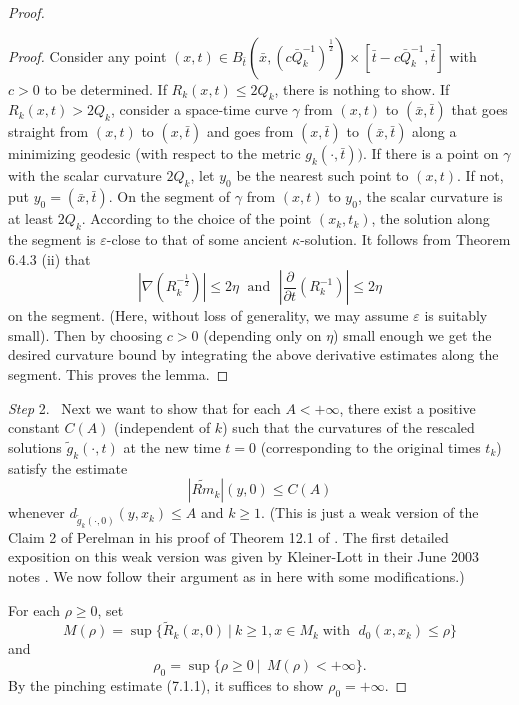 \begin{proof}
\begin{proof}
Consider any point $(x,t)\in B_{\bar{t}}(\bar{x},
(c\bar{Q}_k^{-1})^{\frac{1}{2}})\times
[\bar{t}-c\bar{Q}_k^{-1},\bar{t}]$ with $c>0$ to be determined. If
$R_k(x,t)\leq 2Q_k$, there is nothing to show. If $R_k(x,t)>
2Q_k$, consider a space-time curve $\gamma$ from $(x,t)$ to
$(\bar{x},\bar{t})$ that goes straight from $(x,t)$ to
$(x,\bar{t})$ and goes from $(x,\bar{t})$ to $(\bar{x},\bar{t})$
along a minimizing geodesic (with respect to the metric
$g_k(\cdot,\bar{t}))$. If there is a point on $\gamma$ with the
scalar curvature $2Q_k$, let $y_0$ be the nearest such point to
$(x,t)$. If not, put $y_0=(\bar{x},\bar{t}).$ On the segment of
$\gamma$ from $(x,t)$ to $y_0$, the scalar curvature is at least
$2Q_k$. According to the choice of the point $(x_k,t_k)$, the
solution along the segment is $\varepsilon$-close to that of some
ancient $\kappa$-solution. It follows from Theorem 6.4.3 (ii) that
$$
|\nabla(R_k^{-\frac{1}{2}})|\leq 2\eta \; \mbox{ and } \;
\left|\frac{\partial}{\partial t}(R_k^{-1})\right|\leq 2\eta
$$
on the segment. (Here, without loss of generality, we may assume
$\varepsilon$ is suitably small). Then by choosing $c>0$
(depending only on $\eta$) small enough we get the desired
curvature bound by integrating the above derivative estimates
along the segment. This proves the lemma.
\end{proof}

\smallskip
{\it Step} 2. \  Next we want to show that for each $A<+\infty$,
there exist a positive constant $C(A)$ (independent of $k$) such
that the curvatures of the rescaled solutions
$\tilde{g}_k(\cdot,t)$ at the new time $t =0$ (corresponding to
the original times $t_k$) satisfy the estimate
$$
|\widetilde{Rm}_{k}|(y,0) \leq C(A)
$$
whenever $d_{\tilde{g}_k(\cdot,0)}(y,x_k) \leq A$ and $k \geq 1$.
(This is just a weak version of the Claim 2 of Perelman in his
proof of Theorem 12.1 of \cite{P1}. The first detailed exposition
on this weak version was given by Kleiner-Lott in their June 2003
notes \cite{KL}. We now follow their argument as in \cite{KL} here
with some modifications.)

For each $\rho \geq 0$, set
$$
M(\rho)=\sup\{\tilde{R}_k(x,0)\ |\ k\geq 1, x\in M_k \; \mbox{
with } \;d_{0}(x,x_k)\leq \rho\}
$$
and
$$
\rho_0=\sup\{\rho \geq 0\  |\ \ M(\rho)<+\infty \}.
$$
By the pinching estimate (7.1.1), it suffices to show
$\rho_0=+\infty.$


\end{proof}
